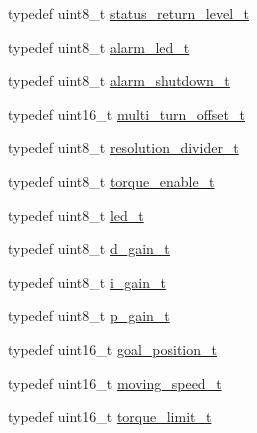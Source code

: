 \begin{DoxyCompactItemize}
\item 
typedef uint8\+\_\+t \hyperlink{structdynamixel_1_1servos_1_1_model_traits_3_01_mx106_01_4_1_1_c_t_a7f4392420340878ca5f723ed47fb7c53}{status\+\_\+return\+\_\+level\+\_\+t}
\item 
typedef uint8\+\_\+t \hyperlink{structdynamixel_1_1servos_1_1_model_traits_3_01_mx106_01_4_1_1_c_t_a798058506f81517dff42eca7d1514529}{alarm\+\_\+led\+\_\+t}
\item 
typedef uint8\+\_\+t \hyperlink{structdynamixel_1_1servos_1_1_model_traits_3_01_mx106_01_4_1_1_c_t_a89d7375c692dec61552d20736f197ef4}{alarm\+\_\+shutdown\+\_\+t}
\item 
typedef uint16\+\_\+t \hyperlink{structdynamixel_1_1servos_1_1_model_traits_3_01_mx106_01_4_1_1_c_t_a94ab13191108b6393e7dda2ebccbafa5}{multi\+\_\+turn\+\_\+offset\+\_\+t}
\item 
typedef uint8\+\_\+t \hyperlink{structdynamixel_1_1servos_1_1_model_traits_3_01_mx106_01_4_1_1_c_t_aa4aa477c0e1427ac07bde5c014b1fecb}{resolution\+\_\+divider\+\_\+t}
\item 
typedef uint8\+\_\+t \hyperlink{structdynamixel_1_1servos_1_1_model_traits_3_01_mx106_01_4_1_1_c_t_a0de072ec1d5f66921ead1a05a67154f5}{torque\+\_\+enable\+\_\+t}
\item 
typedef uint8\+\_\+t \hyperlink{structdynamixel_1_1servos_1_1_model_traits_3_01_mx106_01_4_1_1_c_t_a5be3f69c35fc7d42a111ef0527e9921d}{led\+\_\+t}
\item 
typedef uint8\+\_\+t \hyperlink{structdynamixel_1_1servos_1_1_model_traits_3_01_mx106_01_4_1_1_c_t_afd54421b109461923be30d5d320e5e35}{d\+\_\+gain\+\_\+t}
\item 
typedef uint8\+\_\+t \hyperlink{structdynamixel_1_1servos_1_1_model_traits_3_01_mx106_01_4_1_1_c_t_a506b9446bec1bd217baae086909f12ca}{i\+\_\+gain\+\_\+t}
\item 
typedef uint8\+\_\+t \hyperlink{structdynamixel_1_1servos_1_1_model_traits_3_01_mx106_01_4_1_1_c_t_a7ee89485c2c9e7a9810c9de69c4b6f5c}{p\+\_\+gain\+\_\+t}
\item 
typedef uint16\+\_\+t \hyperlink{structdynamixel_1_1servos_1_1_model_traits_3_01_mx106_01_4_1_1_c_t_ad8762c6959b7cd4f392fee8b21c21ab1}{goal\+\_\+position\+\_\+t}
\item 
typedef uint16\+\_\+t \hyperlink{structdynamixel_1_1servos_1_1_model_traits_3_01_mx106_01_4_1_1_c_t_a11b514fecd252690a34d69a0f8dda17a}{moving\+\_\+speed\+\_\+t}
\item 
typedef uint16\+\_\+t \hyperlink{structdynamixel_1_1servos_1_1_model_traits_3_01_mx106_01_4_1_1_c_t_a4df9388d71baa1cff9d216a92def8d73}{torque\+\_\+limit\+\_\+t}

\end{DoxyCompactItemize}
